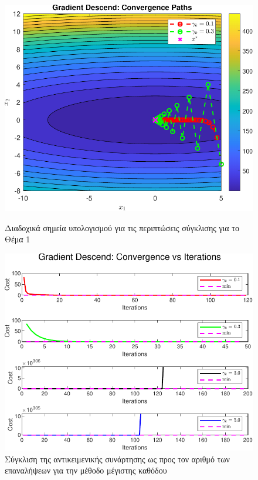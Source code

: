 \documentclass[a4paper,12pt]{article}
\begin{document}
\begin{figure}[h]
    \centering
    \begin{minipage}{0.47\textwidth}
        \centering
        \includegraphics[width=1\linewidth]{plot/task1_contour.pdf}
        \caption{\small Διαδοχικά σημεία υπολογισμού για τις περιπτώσεις σύγκλισης για το Θέμα 1}
        \label{fig:task1_contour}
    \end{minipage} \hfill
    \begin{minipage}{0.47\textwidth}
        \centering
        \includegraphics[width=1\linewidth]{plot/task1_convergence.pdf}
        \caption{\small Σύγκλιση της αντικειμενικής συνάρτησης ως προς τον αριθμό των επαναλήψεων για την μέθοδο μέγιστης καθόδου}
        \label{fig:task1_convergence}
    \end{minipage}
\end{figure}
\end{document}
